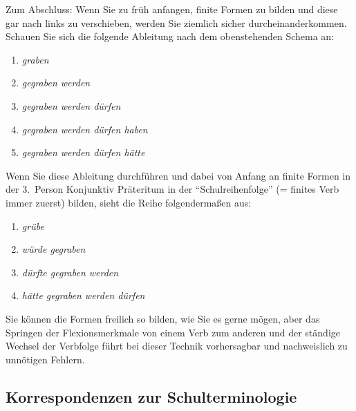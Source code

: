 \newpage

Zum Abschluss: Wenn Sie zu früh anfangen, finite Formen zu bilden und diese gar nach links zu verschieben, werden Sie ziemlich sicher durcheinanderkommen.
Schauen Sie sich die folgende Ableitung nach dem obenstehenden Schema an:

\begin{enumerate}
  \item \textit{graben}\\
  \item \textit{gegraben werden}\\
  \item \textit{gegraben werden dürfen}\\
  \item \textit{gegraben werden dürfen haben}\\
  \item \textit{gegraben werden dürfen hätte}\\
\end{enumerate}

Wenn Sie diese Ableitung durchführen und dabei von Anfang an finite Formen in der 3.~Person Konjunktiv Präteritum in der "`Schulreihenfolge"' (= finites Verb immer zuerst) bilden, sieht die Reihe folgendermaßen aus:

\begin{enumerate}
  \item \textit{grübe}
  \item \textit{würde gegraben}
  \item \textit{dürfte gegraben werden}
  \item \textit{hätte gegraben werden dürfen}
\end{enumerate}

Sie können die Formen freilich so bilden, wie Sie es gerne mögen, aber das Springen der Flexionsmerkmale von einem Verb zum anderen und der ständige Wechsel der Verbfolge führt bei dieser Technik vorhersagbar und nachweislich zu unnötigen Fehlern.

\subsection{Korrespondenzen zur Schulterminologie}

